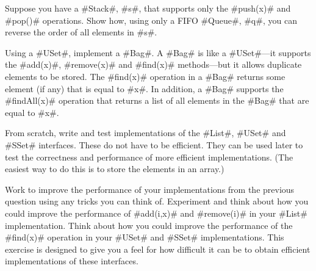 \begin{exc}
  Suppose you have a #Stack#, #s#, that supports only the #push(x)#
  and #pop()# operations. Show how, using only a FIFO #Queue#, #q#,
  you can reverse the order of all elements in #s#.
\end{exc}

\begin{exc}
  Using a #USet#, implement a #Bag#.  A #Bag# is like a #USet#---it
  supports the #add(x)#, #remove(x)# and #find(x)# methods---but it allows
  duplicate elements to be stored.  The #find(x)# operation in a #Bag#
  returns some element (if any) that is equal to #x#.  In addition,
  a #Bag# supports the #findAll(x)# operation that returns a list of
  all elements in the #Bag# that are equal to #x#.
\end{exc}

\begin{exc}
  From scratch, write and test implementations of the #List#, #USet#
  and #SSet# interfaces.  These do not have to be efficient.  They can
  be used later to test the correctness and performance of more efficient
  implementations.  (The easiest way to do this is to store the elements
  in an array.)
\end{exc}

\begin{exc}
  Work to improve the performance of your implementations from the
  previous question using any tricks you can think of.  Experiment and
  think about how you could improve the performance of #add(i,x)# and
  #remove(i)# in your #List# implementation.  Think about how you could
  improve the performance of the #find(x)# operation in your #USet#
  and #SSet# implementations.  This exercise is designed to give you a
  feel for  how difficult it can be to obtain efficient implementations
  of these interfaces.
\end{exc}





